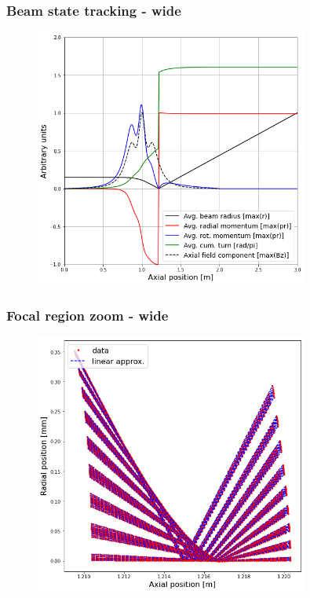 \documentclass{beamer}
\begin{document}
\begin{frame}
  \frametitle{Beam state tracking - wide}
  \begin{figure}
    \includegraphics[width=0.8\textwidth]{felddurchgang_wide}
  \end{figure}
\end{frame}

\begin{frame}
  \frametitle{Focal region zoom - wide}
  \begin{figure}
    \includegraphics[width=0.8\textwidth]{focus_zoom_wide}
  \end{figure}
\end{frame}
\end{document}
